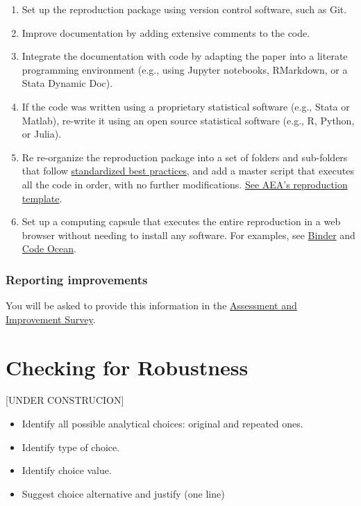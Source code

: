 \documentclass[]{book}
\providecommand{\tightlist}{%
  \setlength{\itemsep}{0pt}\setlength{\parskip}{0pt}}
\begin{document}
\begin{enumerate}
\def\labelenumi{\arabic{enumi}.}
\tightlist
\item
  Set up the reproduction package using version control software, such as Git.
\item
  Improve documentation by adding extensive comments to the code.
\item
  Integrate the documentation with code by adapting the paper into a literate programming environment (e.g., using Jupyter notebooks, RMarkdown, or a Stata Dynamic Doc).
\item
  If the code was written using a proprietary statistical software (e.g., Stata or Matlab), re-write it using an open source statistical software (e.g., R, Python, or Julia).
\item
  Re re-organize the reproduction package into a set of folders and sub-folders that follow \href{https://www.projecttier.org/tier-protocol/specifications/\#overview-of-the-documentation}{standardized best practices}, and add a master script that executes all the code in order, with no further modifications. \href{https://github.com/AEADataEditor/replication-template}{See AEA's reproduction template}.\\
\item
  Set up a computing capsule that executes the entire reproduction in a web browser without needing to install any software. For examples, see \href{https://mybinder.org/}{Binder} and \href{https://codeocean.com/}{Code Ocean}.
\end{enumerate}

\hypertarget{reporting-improvements}{%
\subsection{Reporting improvements}\label{reporting-improvements}}

You will be asked to provide this information in the \href{ADD\%20LINK}{Assessment and Improvement Survey}.

\hypertarget{robust}{%
\chapter{Checking for Robustness}\label{robust}}

{[}UNDER CONSTRUCION{]}

\begin{itemize}
\tightlist
\item
  Identify all possible analytical choices: original and repeated ones.\\
\item
  Identify type of choice.\\
\item
  Identify choice value.
\item
  Suggest choice alternative and justify (one line)
\end{itemize}
\end{document}
